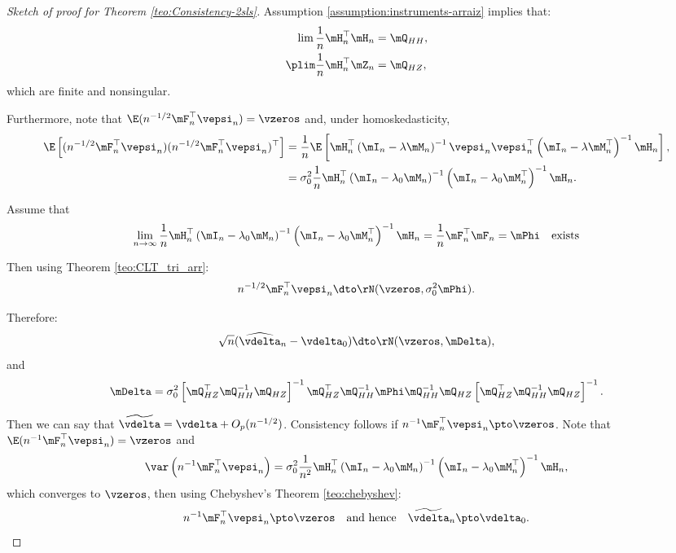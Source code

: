 \begin{proof}[Sketch of proof for Theorem \ref{teo:Consistency-2sls}]
Assumption \ref{assumption:instruments-arraiz} implies that:
\begin{equation*}
\begin{aligned}
  \lim \frac{1}{n}\mH_n^\top\mH_n &= \mQ_{HH}, \\
  \plim \frac{1}{n}\mH_n^\top\mZ_n & = \mQ_{HZ},
\end{aligned}
\end{equation*}
%
which are finite and nonsingular. 

Furthermore, note that $\E(n^{-1/2}\mF_n^\top\vepsi_n) = \vzeros$ and, under homoskedasticity,  
\begin{equation*}
\begin{aligned}
\E\left[(n^{-1/2}\mF_n^\top\vepsi_n)(n^{-1/2}\mF_n^\top\vepsi_n)^\top\right] & = \frac{1}{n}\E\left[\mH_n^\top\left(\mI_n -\lambda\mM_n\right)^{-1}\vepsi_n\vepsi_n^\top\left(\mI_n -\lambda\mM_n^\top\right)^{-1} \mH_n \right], \\
& = \sigma^2_0\frac{1}{n}\mH_n^\top\left(\mI_n -\lambda_0\mM_n\right)^{-1}\left(\mI_n -\lambda_0\mM_n^\top\right)^{-1} \mH_n. 
\end{aligned}
\end{equation*}

Assume that 
\begin{equation*}
\lim_{n\to\infty}\frac{1}{n}\mH_n^\top\left(\mI_n -\lambda_0\mM_n\right)^{-1}\left(\mI_n -\lambda_0\mM_n^\top\right)^{-1} \mH_n = \frac{1}{n}\mF^\top_n\mF_n =\mPhi\quad \mbox{exists}
\end{equation*}

Then using Theorem \ref{teo:CLT_tri_arr}:
\begin{equation*}
n^{-1/2}\mF_n^\top\vepsi_n\dto \rN(\vzeros, \sigma^2_0\mPhi).
\end{equation*}

Therefore:
\begin{equation*}
\sqrt{n}(\widehat{\vdelta}_{n} - \vdelta_0) \dto \rN(\vzeros, \mDelta),
\end{equation*}
%
and
\begin{equation*}
  \mDelta = \sigma^2_{0}\left[\mQ_{HZ}^\top\mQ_{HH}^{-1}\mQ_{HZ}\right]^{-1}\mQ_{HZ}^\top\mQ_{HH}^{-1}\mPhi\mQ_{HH}^{-1}\mQ_{HZ}\left[\mQ_{HZ}^\top\mQ_{HH}^{-1}\mQ_{HZ}\right]^{-1}.
\end{equation*}

Then we can say that $\widetilde{\vdelta} = \vdelta + O_p(n^{-1/2})$. Consistency follows if $n^{-1}\mF_n^\top\vepsi_n\pto \vzeros$. Note that $\E(n^{-1}\mF_n^\top\vepsi_n) = \vzeros$ and 
\begin{equation*}
\var\left(n^{-1}\mF_n^\top\vepsi_n\right)=\sigma^2_0\frac{1}{n^2}\mH_n^\top\left(\mI_n -\lambda_0\mM_n\right)^{-1}\left(\mI_n -\lambda_0\mM_n^\top\right)^{-1} \mH_n,
\end{equation*}
%
which converges to $\vzeros$, then using Chebyshev's Theorem \ref{teo:chebyshev}:
\begin{equation*}
  n^{-1}\mF_n^\top\vepsi_n\pto \vzeros\quad\mbox{and hence}\quad \widetilde{\vdelta}_n\pto\vdelta_0.
\end{equation*}
\end{proof}


